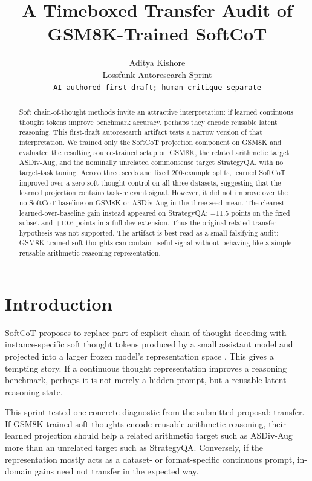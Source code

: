 \documentclass{article}
\title{A Timeboxed Transfer Audit of GSM8K-Trained SoftCoT}
\author{%
  Aditya Kishore\\
  Lossfunk Autoresearch Sprint\\
  \texttt{AI-authored first draft; human critique separate}\\
}
\begin{document}
\maketitle

\begin{abstract}
Soft chain-of-thought methods invite an attractive interpretation: if learned continuous thought tokens improve benchmark accuracy, perhaps they encode reusable latent reasoning. This first-draft autoresearch artifact tests a narrow version of that interpretation. We trained only the SoftCoT projection component on GSM8K and evaluated the resulting source-trained setup on GSM8K, the related arithmetic target ASDiv-Aug, and the nominally unrelated commonsense target StrategyQA, with no target-task tuning. Across three seeds and fixed 200-example splits, learned SoftCoT improved over a zero soft-thought control on all three datasets, suggesting that the learned projection contains task-relevant signal. However, it did not improve over the no-SoftCoT baseline on GSM8K or ASDiv-Aug in the three-seed mean. The clearest learned-over-baseline gain instead appeared on StrategyQA: +11.5 points on the fixed subset and +10.6 points in a full-dev extension. Thus the original related-transfer hypothesis was not supported. The artifact is best read as a small falsifying audit: GSM8K-trained soft thoughts can contain useful signal without behaving like a simple reusable arithmetic-reasoning representation.
\end{abstract}

\section{Introduction}

SoftCoT proposes to replace part of explicit chain-of-thought decoding with instance-specific soft thought tokens produced by a small assistant model and projected into a larger frozen model's representation space \citep{xuyi2025softcot}. This gives a tempting story. If a continuous thought representation improves a reasoning benchmark, perhaps it is not merely a hidden prompt, but a reusable latent reasoning state.

This sprint tested one concrete diagnostic from the submitted proposal: transfer. If GSM8K-trained soft thoughts encode reusable arithmetic reasoning, their learned projection should help a related arithmetic target such as ASDiv-Aug more than an unrelated target such as StrategyQA. Conversely, if the representation mostly acts as a dataset- or format-specific continuous prompt, in-domain gains need not transfer in the expected way.
\end{document}
